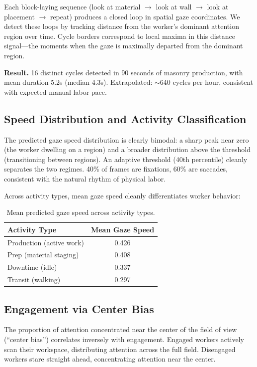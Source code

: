 \documentclass{article}
\begin{document}
Each block-laying sequence (look at material $\rightarrow$ look at wall $\rightarrow$ look at placement $\rightarrow$ repeat) produces a closed loop in spatial gaze coordinates. We detect these loops by tracking distance from the worker's dominant attention region over time. Cycle borders correspond to local maxima in this distance signal---the moments when the gaze is maximally departed from the dominant region.

\textbf{Result.} 16 distinct cycles detected in 90 seconds of masonry production, with mean duration 5.2s (median 4.3s). Extrapolated: $\sim$640 cycles per hour, consistent with expected manual labor pace.

\subsection{Speed Distribution and Activity Classification}

The predicted gaze speed distribution is clearly bimodal: a sharp peak near zero (the worker dwelling on a region) and a broader distribution above the threshold (transitioning between regions). An adaptive threshold (40th percentile) cleanly separates the two regimes. 40\% of frames are fixations, 60\% are saccades, consistent with the natural rhythm of physical labor.

Across activity types, mean gaze speed cleanly differentiates worker behavior:

\begin{table}[h]
\centering
\caption{Mean predicted gaze speed across activity types.}
\begin{tabular}{lc}
\toprule
Activity Type & Mean Gaze Speed \\
\midrule
Production (active work) & 0.426 \\
Prep (material staging) & 0.408 \\
Downtime (idle) & 0.337 \\
Transit (walking) & 0.297 \\
\bottomrule
\end{tabular}
\end{table}

\subsection{Engagement via Center Bias}

The proportion of attention concentrated near the center of the field of view (``center bias'') correlates inversely with engagement. Engaged workers actively scan their workspace, distributing attention across the full field. Disengaged workers stare straight ahead, concentrating attention near the center.
\end{document}
